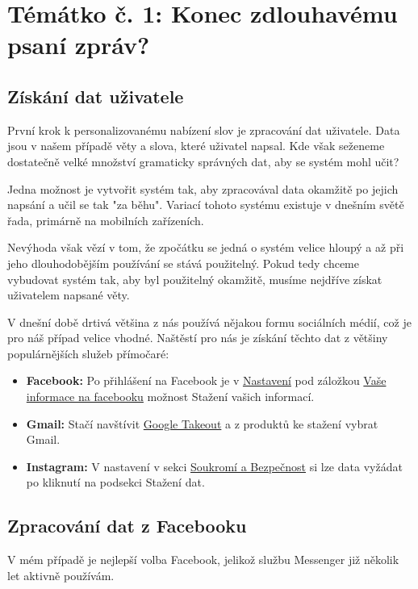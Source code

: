 \documentclass[a4paper, 12pt]{article}
\begin{document}
  \section{Témátko č. 1: Konec zdlouhavému psaní zpráv?}

  \subsection{Získání dat uživatele}
  První krok k personalizovanému nabízení slov je zpracování dat uživatele. Data jsou v našem případě věty a slova, které uživatel napsal. Kde však seženeme dostatečně velké množství gramaticky správných dat, aby se systém mohl učit?

  Jedna možnost je vytvořit systém tak, aby zpracovával data okamžitě po jejich napsání a učil se tak "za běhu". Variací tohoto systému existuje v dnešním světě řada, primárně na mobilních zařízeních.

  Nevýhoda však vězí v tom, že zpočátku se jedná o systém velice hloupý a až při jeho dlouhodobějším používání se stává použitelný. Pokud tedy chceme vybudovat systém tak, aby byl použitelný okamžitě, musíme nejdříve získat uživatelem napsané věty.

  V dnešní době drtivá většina z nás používá nějakou formu sociálních médií, což je pro náš případ velice vhodné. Naštěstí pro nás je získání těchto dat z většiny populárnějších služeb přímočaré:
  \begin{itemize}
    \item \textbf{Facebook:} Po přihlášení na Facebook je v \href{https://www.facebook.com/settings?tab=your_facebook_information}{Nastavení} pod záložkou \href{https://www.facebook.com/settings?tab=your_facebook_information}{Vaše informace na facebooku} možnost Stažení vašich informací.
    \item \textbf{Gmail:} Stačí navštívit \href{https://takeout.google.com/}{Google Takeout} a z produktů ke stažení vybrat Gmail.
    \item \textbf{Instagram:} V nastavení v sekci \href{https://www.instagram.com/download/request/}{Soukromí a Bezpečnost} si lze data vyžádat po kliknutí na podsekci Stažení dat.
  \end{itemize}

  \subsection{Zpracování dat z Facebooku}
  V mém případě je nejlepší volba Facebook, jelikož službu Messenger již několik let aktivně používám.
\end{document}
